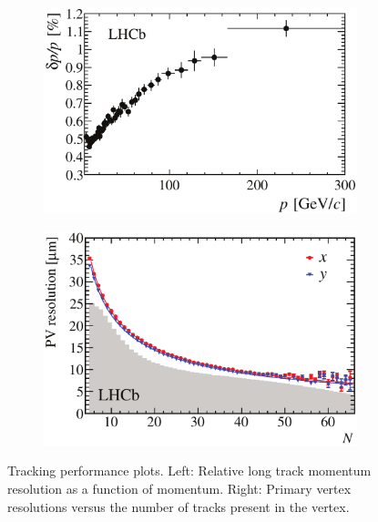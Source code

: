 \begin{figure}[t]
  \centering
  \begin{subfigure}{0.5\textwidth}
    \raggedright
    \includegraphics[width=\textwidth]{Figures/Chapter2/dppVsp-crop-cmyk}
    \caption{}
    \label{det_deltappvp}
  \end{subfigure}%
  \hfill%
  \begin{subfigure}{0.5\textwidth}
    \raggedleft
    \includegraphics[width=\textwidth]{Figures/Chapter2/DataResXY_1PV_2012-crop-cmyk.pdf}
    \caption{}
    \label{det_velo_pv_res}
  \end{subfigure}
  \caption{Tracking performance plots. Left: Relative long track momentum resolution as a function of momentum.
          Right: Primary vertex resolutions versus the number of tracks present in the vertex.}
  \label{det_velo_perf}
\end{figure}


